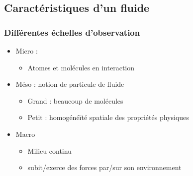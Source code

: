 \documentclass[%
	final, %
	 10pt, %
 	compress, %
hyperref={bookmarks=true}	
]{beamer}
\begin{document}
\subsection{Caractéristiques d'un fluide}
\label{sec:caracteristiques}


\begin{frame}\frametitle{Différentes échelles d'observation}
\begin{itemize}
\item Micro :
\begin{itemize}
\item Atomes et molécules en interaction 
\end{itemize}
\item Méso : notion de particule de fluide
\begin{itemize}
\item Grand : beaucoup de molécules
\item Petit : homogénéïté spatiale des propriétés physiques
\end{itemize}
\item Macro
\begin{itemize}
\item Milieu continu
\item subit/exerce des forces par/sur son environnement 
\end{itemize}
\end{itemize}
\end{frame}
\end{document}
